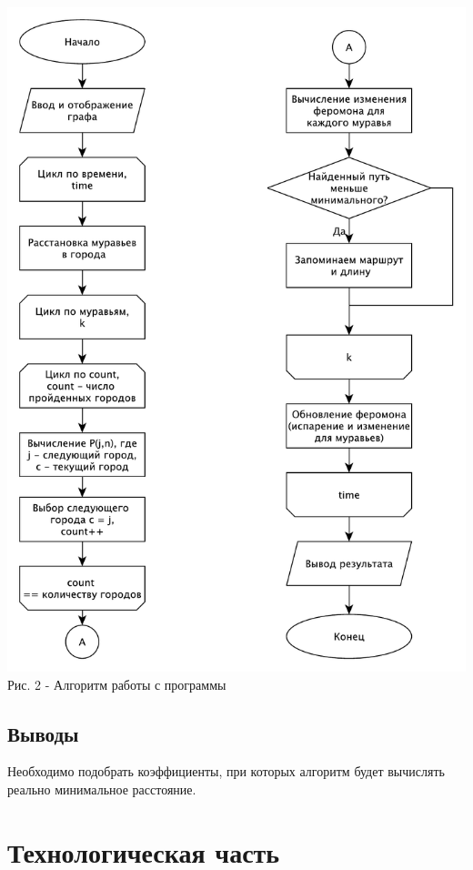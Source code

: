 \documentclass[a4paper,14pt]{article} %
\begin{document}
        \hfill

	\hfill
	
	\begin{center}
        		\includegraphics[scale = 0.7]{shema1} \\ Рис. 2 - Алгоритм работы с программы
	\end{center}
        	
	\subsection{Выводы}
	\hfill
	
	Необходимо подобрать коэффициенты, при которых алгоритм будет вычислять реально минимальное расстояние.  
	
			
    	\newpage

        \section{Технологическая часть}
        \hfill
        
\end{document}

